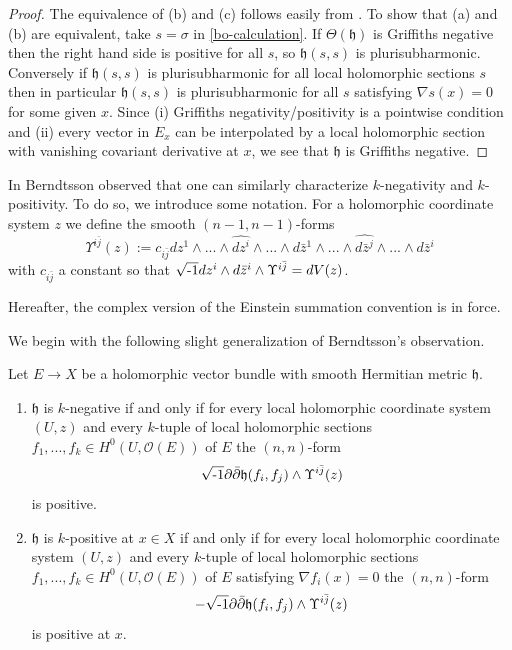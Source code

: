 \documentclass[12pt,hidelinks]{amsart}
\newcommand{\cO}{{\mathcal O}}
\newcommand{\fh}{{\mathfrak h}}
\newcommand{\di}{\partial}
\newcommand{\dbar}{\bar \partial}
\newcommand{\ii}{\sqrt{\text{\rm -}1}}
\begin{document}
\begin{proof}
The equivalence of (b) and (c) follows easily from \cite[Theorem 1.6.3]{hormander-book}.  To show that (a) and (b) are equivalent, take $s= \sigma$ in \eqref{bo-calculation}.  If $\Theta (\fh)$ is Griffiths negative then the right hand side is positive for all $s$, so $\fh(s,s)$ is plurisubharmonic.  Conversely if $\fh(s,s)$ is plurisubharmonic for all local holomorphic sections $s$ then in particular $\fh(s,s)$ is plurisubharmonic for all $s$ satisfying $\nabla s(x) = 0$ for some given $x$.  Since (i) Griffiths negativity/positivity is a pointwise condition and (ii) every vector in $E_x$ can be interpolated by a local holomorphic section with vanishing covariant derivative at $x$, we see that $\fh$ is Griffiths negative.
\end{proof}

In \cite{bo-annals} Berndtsson observed that one can similarly characterize $k$-negativity and $k$-positivity. To do so, we introduce some notation.  For a holomorphic coordinate system $z$ we define the smooth $(n-1, n-1)$-forms 
\begin{equation}\label{bo-forms}
\Upsilon ^{i \bar j}(z) := c_{i \bar j} dz ^1 \wedge ... \wedge \widehat{dz ^i} \wedge ...  \wedge d\bar z ^1 \wedge ... \wedge \widehat{d\bar z ^j} \wedge ... \wedge d\bar z ^i
\end{equation}
with $c_{i \bar j}$ a constant so that $\ii dz ^i \wedge d\bar z^i \wedge \Upsilon ^{i \bar j} = dV(z)$.

\medskip

Hereafter, the complex version of the Einstein summation convention is in force.

\medskip

We begin with the following slight generalization of Berndtsson's observation.

\begin{prop}\label{k-prop}
Let $E \to X$ be a holomorphic vector bundle with smooth Hermitian metric $\fh$.
\begin{enumerate}[{\rm i.}]
\item $\fh$ is $k$-negative if and only if for every local holomorphic coordinate system $(U, z)$ and every $k$-tuple of local holomorphic sections $f_1,..., f_k \in H^0(U, \cO(E))$ of $E$ the $(n,n)$-form 
\[
\ii \di \dbar \fh (f_i , f_j) \wedge \Upsilon ^{i \bar j} (z)
\]
is positive.
\item $\fh$ is $k$-positive at $x \in X$ if and only if for every local holomorphic coordinate system $(U,z)$ and every $k$-tuple of local holomorphic sections $f_1,..., f_k\in H^0(U, \cO(E))$ of $E$ satisfying $\nabla f_i (x) = 0$ the $(n,n)$-form 
\[
- \ii \di \dbar \fh (f_i , f_j) \wedge \Upsilon ^{i \bar j} (z)
\]
is positive at $x$.  
\end{enumerate}
\end{prop}
\end{document}
